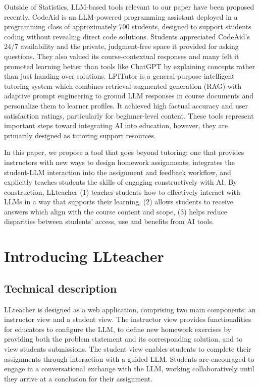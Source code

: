 \documentclass[
  12pt]{article}
\begin{document}
Outside of Statistics, LLM-based tools relevant to our paper have been proposed recently.
CodeAid \citep{kazemitabaar2024codeaid} is an LLM-powered programming assistant deployed in a programming class of approximately 700 students, designed to support students coding without revealing direct code solutions. 
Students appreciated CodeAid's 24/7 availability and the private, judgment-free space it provided for asking questions. 
They also valued its course-contextual responses and many felt it promoted learning better than tools like ChatGPT by explaining concepts rather than just handing over solutions.
LPITutor \citep{liu2025lpitutor} is a general-purpose intelligent tutoring system which combines retrieval-augmented generation (RAG) with adaptive prompt engineering to ground LLM responses in course documents and personalize them to learner profiles. It achieved high factual accuracy and user satisfaction ratings, particularly for beginner-level content.
These tools represent important steps toward integrating AI into education, however, they are primarily designed as tutoring support resources.


In this paper, we propose a tool that goes beyond tutoring: one that provides instructors with new ways to design homework assignments, integrates the student-LLM interaction into the assignment and feedback workflow, and explicitly teaches students the skills of engaging constructively with AI.
By construction, LLteacher (1) teaches students how to effectively interact with LLMs in a way that supports their learning, (2) allows students to receive answers which align with the course content and scope, (3) helps reduce disparities between students' access, use and benefits from AI tools.


\section{Introducing LLteacher \label{sec:introducing}}

\subsection{Technical description \label{sec:introducing-technical-descr}}

LLteacher is designed as a web application, comprising two main components: an instructor view and a student view. The instructor view provides functionalities for educators to configure the LLM, to define new homework exercises by providing both the problem statement and its corresponding solution, and to view students submissions.
The student view enables students to complete their assignments through interaction with a guided LLM. 
Students are encouraged to engage in a conversational exchange with the LLM, working collaboratively until they arrive at a conclusion for their assignment.
\end{document}

